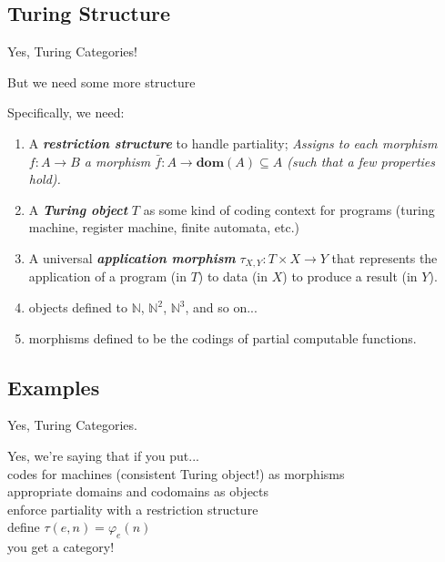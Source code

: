 \documentclass[10pt]{beamer}
\newcommand\newterm[2][]{\textbf{\itshape\color{blue!50!black}#2}}
\DeclareRobustCommand{\step}{\bigskip\noindent}
\newcommand{\dom}[1]{\mathbf{dom}\left(#1\right)}
\newcommand\N{\mathbb{N}}
\begin{document}
\subsection{Turing Structure}

\begin{frame}[fragile]{Yes, Turing Categories!}

  \alert{But we need some more structure}

  Specifically, we need:
  \begin{enumerate}
    \item A \newterm{restriction structure} to handle partiality; \newline
      \emph{
        Assigns to each morphism $f : A \to B$ a morphism
        $\bar{f} : A \to \dom{A} \subseteq A$
        (such that a few properties hold).
      }
    \item A \newterm{Turing object} $T$ as some kind of coding context
      for programs (turing machine, register machine, finite automata, etc.)
    \item A universal \newterm{application morphism} $\tau_{X,Y} : T \times X \to Y$
      that represents the application of a program (in $T$) to data (in $X$)
      to produce a result (in $Y$).
    \item objects defined to $\N$, $\N^2$, $\N^3$, and so on...
    \item morphisms defined to be the codings of partial computable functions.
  \end{enumerate}

\end{frame}

\subsection{Examples}

\begin{frame}[fragile]{Yes, Turing Categories.}

  Yes, we're saying that if you put... \\
  \qquad codes for \alert{machines} (consistent Turing object!) as \alert{morphisms} \\
  \qquad \qquad appropriate domains and codomains as \alert{objects} \\
  \qquad \qquad \qquad enforce partiality with a \alert{restriction structure} \\
  \qquad \qquad \qquad \qquad define $\tau(e, n) = \varphi_e(n)$ \\
  
  \step
  \alert{you get a category}!

\end{frame}
\end{document}
